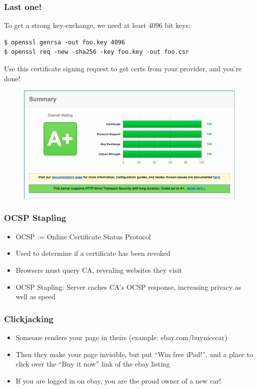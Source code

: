 \documentclass[9pt]{beamer}
\begin{document}
\begin{frame}[fragile]
\frametitle{Last one!}
To get a strong key-exchange, we need at least 4096 bit keys:
\begin{verbatim}
$ openssl genrsa -out foo.key 4096
$ openssl req -new -sha256 -key foo.key -out foo.csr
\end{verbatim}
Use this certificate signing request to get certs from your provider, and you're done!
\begin{figure}
\includegraphics[scale=0.25]{figures/App.png}
\end{figure}
\end{frame}

\begin{frame}[fragile]
\frametitle{OCSP Stapling}
\begin{itemize}
\item OCSP := Online Certificate Status Protocol
\item Used to determine if a certificate has been revoked
\item Browsers must query CA, revealing websites they visit
\item OCSP Stapling: Server caches CA's OCSP response, increasing privacy as well as speed
\end{itemize}
\end{frame}

\begin{frame}[fragile]
\frametitle{Clickjacking}
\begin{itemize}
\item Someone renders your page in theirs (example: ebay.com/buynicecar)
\item Then they make your page invisible, but put ``Win free iPad!'', and a place to click over the ``Buy it now'' link of the ebay listing
\item If you are logged in on ebay, you are the proud owner of a new car!
\end{itemize}
\end{frame}
\end{document}
